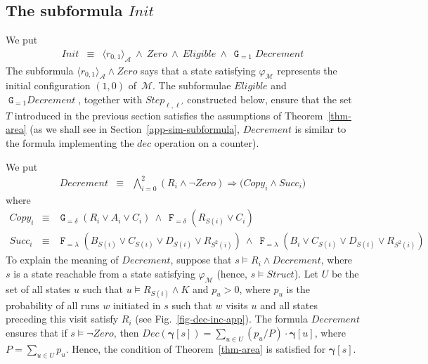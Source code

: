 \documentclass[a4paper,UKenglish,cleveref, autoref, thm-restate]{lipics-v2021}
\newcommand{\A}{\mathcal{A}}
\newcommand{\M}{\mathcal{M}}
\newcommand{\ex}[1]{\langle #1 \rangle}
\newcommand{\Init}{\mathit{Init}}
\newcommand{\Step}{\mathit{Step}}
\newcommand{\Zero}{\mathit{Zero}}
\newcommand{\Succ}{\mathit{Succ}}
\newcommand{\DEC}{\mathit{Dec}}
\renewcommand{\vec}[1]{\pmb{#1}}
\newcommand{\Struct}{\textit{Struct}}
\newcommand{\Decrement}{\textit{Decrement}}
\newcommand{\Eligible}{\textit{Eligible}}
\newcommand{\Copy}{\textit{Copy}}
\newcommand{\Dec}{\textit{dec}}
\newcommand{\cv}{\vec{\gamma}}
\newcommand*{\opf}{\operatorname{\pmb{\mathtt{F}}}}
\newcommand*{\opg}{\operatorname{\pmb{\mathtt{G}}}}
\begin{document}
\subsection{The subformula $\Init$}
\label{app-init}

We put 
\begin{eqnarray*}
    \Init & \equiv & \ex{r_{0,1}}_{\A} \ \wedge\  \Zero \ \wedge\ \Eligible \ \wedge \ \opg_{=1} \Decrement
\end{eqnarray*}
The subformula $\ex{r_{0,1}}_{\A} \wedge \Zero$ says that a state satisfying $\varphi_\M$ represents the initial configuration $(1,0)$ of~$\M$. The subformulae $\Eligible$ and $\opg_{=1} \Decrement$, together with $\Step_{\ell,\ell'}$ constructed below, ensure that the set $T$ introduced in the previous section satisfies the assumptions of Theorem~\ref{thm-area} (as we shall see in Section~\ref{app-sim-subformula}, $\Decrement$ is similar to the formula implementing the $\Dec$ operation on a counter).

We put
\begin{eqnarray*}
    \Decrement & \equiv & \bigwedge_{i=0}^2 (R_i {\wedge} \neg\Zero) 
        \Rightarrow \bigg( \Copy_i \wedge \Succ_i \bigg)               
\end{eqnarray*}
where
\begin{eqnarray*}
    \Copy_i & \equiv &
       \opg_{=\delta}(R_i {\vee} A_i {\vee} C_i) 
        \ \wedge \ \opf_{=\delta}(R_{S(i)} {\vee} C_i)\\
    \Succ_i & \equiv & \opf_{=\lambda}(B_{S(i)} {\vee} C_{S(i)} {\vee} D_{S(i)} {\vee}
          R_{S^2(i)}) \ \wedge \ \opf_{=\lambda}(B_i {\vee} C_{S(i)} {\vee} D_{S(i)} {\vee} R_{S^2(i)})             
\end{eqnarray*}To explain the meaning of $\Decrement$, suppose that $s \models R_i \wedge \Decrement$, where $s$ is a state reachable from a state satisfying $\varphi_\M$ (hence, $s \models \Struct$). Let $U$ be the set of all states $u$ such that $u \models R_{S(i)} \wedge K$ and $p_u > 0$, where $p_u$ is the probability of all runs $w$ initiated in $s$ such that $w$ visits $u$ and all states preceding this visit satisfy $R_i$ (see Fig.~\ref{fig-dec-inc-app}). The formula $\Decrement$ ensures that if $s \models \neg\Zero$, then $\DEC(\cv[s]) = \sum_{u \in U} (p_u/P) \cdot \cv[u]$, where $P = \sum_{u \in U} p_u$. Hence, the condition of Theorem~\ref{thm-area} is satisfied for $\cv[s]$.
\end{document}
